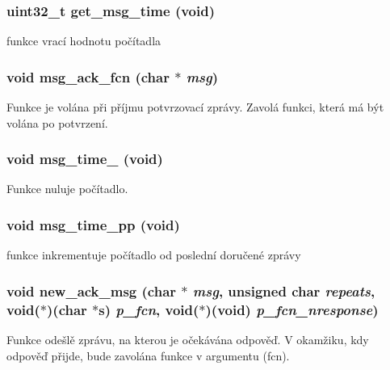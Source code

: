 \subsubsection[{get\_\-msg\_\-time}]{\setlength{\rightskip}{0pt plus 5cm}uint32\_\-t get\_\-msg\_\-time (void)}\label{usart_8h_ac615ce8c07d61bbd036d865021d0535b}


funkce vrací hodnotu počítadla 
\subsubsection[{msg\_\-ack\_\-fcn}]{\setlength{\rightskip}{0pt plus 5cm}void msg\_\-ack\_\-fcn (char $\ast$ {\em msg})}\label{usart_8h_a2c55776d951e70bb73e5b15621e30361}
Funkce je volána při příjmu potvrzovací zprávy. Zavolá funkci, která má být volána po potvrzení. 
\subsubsection[{msg\_\-time\_\-0}]{\setlength{\rightskip}{0pt plus 5cm}void msg\_\-time\_ (void)}\label{usart_8h_a0405ce6027c0b29fe71ec8a995df096f}


Funkce nuluje počítadlo. 
\subsubsection[{msg\_\-time\_\-pp}]{\setlength{\rightskip}{0pt plus 5cm}void msg\_\-time\_\-pp (void)}\label{usart_8h_a170941d619f0e1bbf13ec95111cecb19}


funkce inkrementuje počítadlo od poslední doručené zprávy 
\subsubsection[{new\_\-ack\_\-msg}]{\setlength{\rightskip}{0pt plus 5cm}void new\_\-ack\_\-msg (char $\ast$ {\em msg}, \/  unsigned char {\em repeats}, \/  void($\ast$)(char $\ast$s) {\em p\_\-fcn}, \/  void($\ast$)(void) {\em p\_\-fcn\_\-nresponse})}\label{usart_8h_aece32bc3ab3397ea8202203edf547eb2}
Funkce odešlě zprávu, na kterou je očekávána odpověď. V okamžiku, kdy odpověď přijde, bude zavolána funkce v argumentu (fcn).


